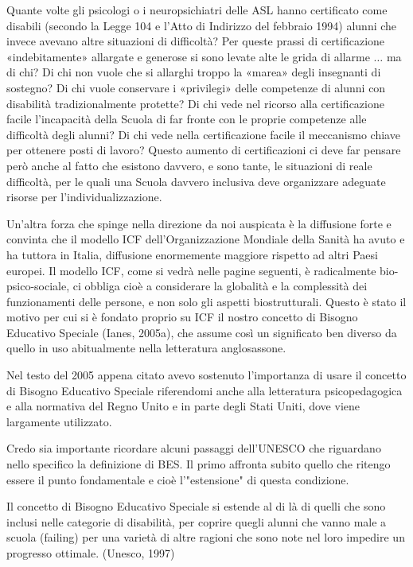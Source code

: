 Quante volte gli psicologi o i neuropsichiatri delle ASL hanno certificato come disabili (secondo
la Legge 104 e l'Atto di Indirizzo del febbraio 1994) alunni che invece avevano altre situazioni di
difficoltà? Per queste prassi di certificazione «indebitamente» allargate e generose si sono levate
alte le grida di allarme $\dots$ ma di chi? Di chi non vuole che si allarghi troppo la «marea» degli
insegnanti di sostegno? Di chi vuole conservare i «privilegi» delle competenze di alunni con
disabilità tradizionalmente protette? Di chi vede nel ricorso alla certificazione facile l'incapacità
della Scuola di far fronte con le proprie competenze alle difficoltà degli alunni? Di chi vede nella
certificazione facile il meccanismo chiave per ottenere posti di lavoro? Questo aumento di
certificazioni ci deve far pensare però anche al fatto che esistono davvero, e sono tante, le
situazioni di reale difficoltà, per le quali una Scuola davvero inclusiva deve organizzare adeguate
risorse per l'individualizzazione.

Un'altra forza che spinge nella direzione da noi auspicata è la diffusione forte e convinta che il
modello ICF dell'Organizzazione Mondiale della Sanità ha avuto e ha tuttora in Italia, diffusione
enormemente maggiore rispetto ad altri Paesi europei. Il modello ICF, come si vedrà nelle pagine
seguenti, è radicalmente bio-psico-sociale, ci obbliga cioè a considerare la globalità e la
complessità dei funzionamenti delle persone, e non solo gli aspetti biostrutturali. Questo è stato il
motivo per cui si è fondato proprio su ICF il nostro concetto di Bisogno Educativo Speciale (Ianes,
2005a), che assume così un significato ben diverso da quello in uso abitualmente nella letteratura
anglosassone.

Nel testo del 2005 appena citato avevo sostenuto l'importanza di usare il concetto di Bisogno
Educativo Speciale riferendomi anche alla letteratura psicopedagogica e alla normativa del Regno
Unito e in parte degli Stati Uniti, dove viene largamente utilizzato.

Credo sia importante ricordare alcuni passaggi dell'UNESCO che riguardano nello specifico la
definizione di BES. Il primo affronta subito quello che ritengo essere il punto fondamentale e cioè
l'"estensione" di questa condizione.

Il concetto di Bisogno Educativo Speciale si estende al di là di quelli che sono inclusi nelle
categorie di disabilità, per coprire quegli alunni che vanno male a scuola (failing) per una varietà di
altre ragioni che sono note nel loro impedire un progresso ottimale. (Unesco, 1997)

